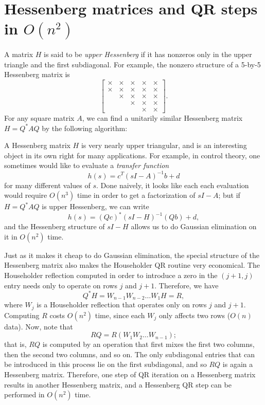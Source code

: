 \documentclass[12pt, leqno]{article} %
\begin{document}

\section{Hessenberg matrices and QR steps in $O(n^2)$}

A matrix $H$ is said to be {\em upper Hessenberg} if it has
nonzeros only in the upper triangle and the first subdiagonal.
For example, the nonzero structure of a 5-by-5 Hessenberg matrix
is
\[
  \begin{bmatrix}
    \times & \times & \times & \times & \times \\
    \times & \times & \times & \times & \times \\
           & \times & \times & \times & \times \\
           &        & \times & \times & \times \\
           &        &        & \times & \times
  \end{bmatrix}.
\]
For any square matrix $A$, we can find a unitarily similar Hessenberg
matrix $H = Q^* A Q$ by the following algorithm:


A Hessenberg matrix $H$ is very nearly upper triangular, and is an
interesting object in its own right for many applications.  For
example, in control theory, one sometimes would like to evaluate a
{\em transfer function}
\[
  h(s) = c^T (sI-A)^{-1} b + d
\]
for many different values of $s$.  Done naively, it looks like each
each evaluation would require $O(n^3)$ time in order to get a
factorization of $sI-A$; but if $H = Q^* A Q$ is upper Hessenberg, we
can write
\[
  h(s) = (Qc)^* (sI-H)^{-1} (Qb) + d,
\]
and the Hessenberg structure of $sI-H$ allows us to do Gaussian
elimination on it in $O(n^2)$ time.

Just as it makes it cheap to do Gaussian elimination, the special
structure of the Hessenberg matrix also makes the Householder QR
routine very economical.  The Householder reflection computed in order
to introduce a zero in the $(j+1,j)$ entry needs only to operate on
rows $j$ and $j+1$.  Therefore, we have
\[
  Q^* H = W_{n-1} W_{n-2} \ldots W_1 H = R,
\]
where $W_{j}$ is a Householder reflection that operates only on rows
$j$ and $j+1$.  Computing $R$ costs $O(n^2)$ time, since each $W_j$
only affects two rows ($O(n)$ data).  Now, note that
\[
  R Q = R (W_1 W_2 \ldots W_{n-1});
\]
that is, $RQ$ is computed by an operation that first mixes the first
two columns, then the second two columns, and so on.  The only subdiagonal
entries that can be introduced in this process lie on the first subdiagonal,
and so $RQ$ is again a Hessenberg matrix.  Therefore, one step of QR iteration
on a Hessenberg matrix results in another Hessenberg matrix, and a Hessenberg
QR step can be performed in $O(n^2)$ time.
\end{document}
